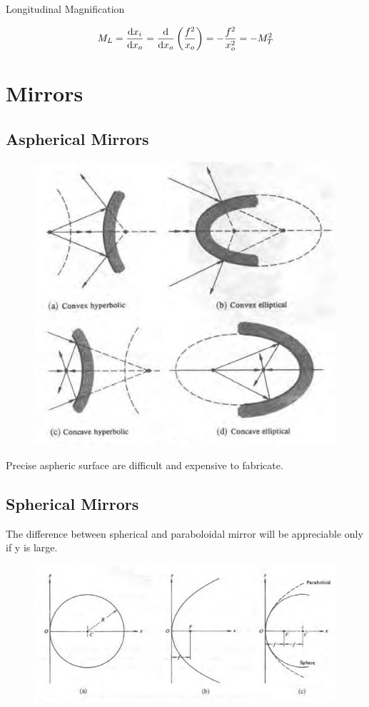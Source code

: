 Longitudinal Magnification

\begin{equation*}
  \begin{aligned}
    M_L = \dfrac{\mathop{}\!\mathrm{d} x_i}{\mathop{}\!\mathrm{d} x_o} = \dfrac{\mathop{}\!\mathrm{d}}{\mathop{}\!\mathrm{d} x_o} \left( \dfrac{f^2}{x_o}  \right) = - \dfrac{f^2}{x_o^2} = - M_T^2   
  \end{aligned}
\end{equation*}

\section{Mirrors}

\subsection{Aspherical Mirrors}

\begin{figure}[H]
  \centering
  \includegraphics[width=0.7\linewidth]{figures/aspherical-mirror.png}
\end{figure}

Precise aspheric surface are difficult and expensive to fabricate.

\subsection{Spherical Mirrors}

The difference between spherical and paraboloidal mirror will be appreciable only if y is large.

\begin{figure}[H]
  \centering
  \includegraphics[width=0.7\linewidth]{figures/spherical-aspherical.png}
\end{figure}

